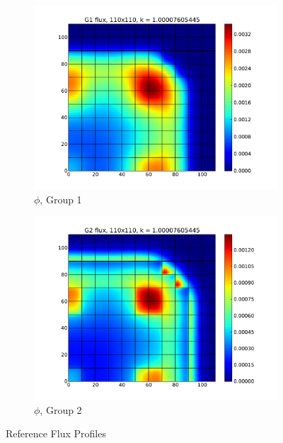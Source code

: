 \documentclass{mc2015}
\begin{document}
\begin{figure}[h]
\centering
  \begin{subfigure}[b]{0.45 \textwidth}
   \includegraphics[width=\textwidth]{g1_50_flux}
   \caption{$\phi$, Group 1}
   \label{g1}
  \end{subfigure}
  \begin{subfigure}[b]{0.45 \textwidth}
   \includegraphics[width=\textwidth]{g2_50_flux}
   \caption{$\phi$, Group 2}
   \label{g2}
  \end{subfigure}
  \caption{Reference Flux Profiles}
  \label{benchflux}
\end{figure}
\end{document}
